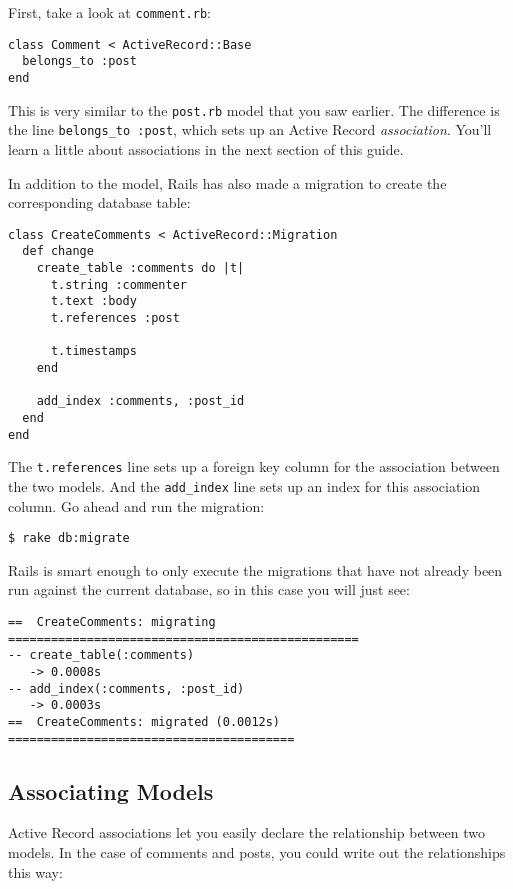 \documentclass[10pt]{book}
\begin{document}
First, take a look at \texttt{comment.rb}:

\begin{verbatim}
class Comment < ActiveRecord::Base
  belongs_to :post
end
\end{verbatim}

This is very similar to the \texttt{post.rb} model that you saw earlier. The difference is the line \texttt{belongs\_to :post}, which sets up an Active Record \emph{association}. You’ll learn a little about associations in the next section of this guide.

In addition to the model, Rails has also made a migration to create the corresponding database table:


\begin{verbatim}
class CreateComments < ActiveRecord::Migration
  def change
    create_table :comments do |t|
      t.string :commenter
      t.text :body
      t.references :post
 
      t.timestamps
    end
 
    add_index :comments, :post_id
  end
end
\end{verbatim}

The \texttt{t.references} line sets up a foreign key column for the association between the two models. And the \texttt{add\_index} line sets up an index for this association column. Go ahead and run the migration:


\begin{verbatim}
$ rake db:migrate
\end{verbatim}

Rails is smart enough to only execute the migrations that have not already been run against the current database, so in this case you will just see:

\begin{verbatim}
==  CreateComments: migrating =================================================
-- create_table(:comments)
   -> 0.0008s
-- add_index(:comments, :post_id)
   -> 0.0003s
==  CreateComments: migrated (0.0012s) ========================================
\end{verbatim}

\subsection{ Associating Models}

Active Record associations let you easily declare the relationship between two models. In the case of comments and posts, you could write out the relationships this way:
\end{document}
